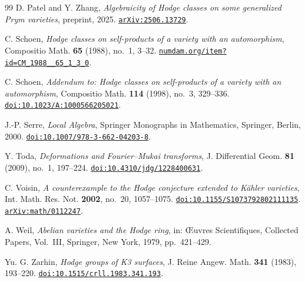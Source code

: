 \documentclass[11pt,reqno]{amsart}
\theoremstyle{plain}
\theoremstyle{definition}
\theoremstyle{remark}
\begin{document}
\begin{thebibliography}{99}
D. Patel and Y. Zhang,
\emph{Algebraicity of Hodge classes on some generalized Prym varieties},
preprint, 2025.
\href{https://arxiv.org/abs/2506.13729}{\texttt{arXiv:2506.13729}}.

C. Schoen,
\emph{Hodge classes on self-products of a variety with an automorphism},
Compositio Math. \textbf{65} (1988), no.~1, 3--32.
\href{http://www.numdam.org/item?id=CM_1988__65_1_3_0}{\texttt{numdam.org/item?id=CM\_1988\_\_65\_1\_3\_0}}.

C. Schoen,
\emph{Addendum to: Hodge classes on self-products of a variety with an
automorphism},
Compositio Math. \textbf{114} (1998), no.~3, 329--336.
\href{https://doi.org/10.1023/A:1000566205021}{\texttt{doi:10.1023/A:1000566205021}}.

J.-P. Serre,
\emph{Local Algebra},
Springer Monographs in Mathematics,
Springer, Berlin, 2000.
\href{https://doi.org/10.1007/978-3-662-04203-8}{\texttt{doi:10.1007/978-3-662-04203-8}}.

Y. Toda,
\emph{Deformations and Fourier--Mukai transforms},
J. Differential Geom. \textbf{81} (2009), no.~1, 197--224.
\href{https://doi.org/10.4310/jdg/1228400631}{\texttt{doi:10.4310/jdg/1228400631}}.

C. Voisin,
\emph{A counterexample to the Hodge conjecture extended to K\"ahler
varieties},
Int. Math. Res. Not. \textbf{2002}, no.~20, 1057--1075.
\href{https://doi.org/10.1155/S1073792802111135}{\texttt{doi:10.1155/S1073792802111135}}.
\href{https://arxiv.org/abs/math/0112247}{\texttt{arXiv:math/0112247}}.

A. Weil,
\emph{Abelian varieties and the Hodge ring},
in: \OE uvres Scientifiques, Collected Papers, Vol.~III,
Springer, New York, 1979, pp.~421--429.

Yu. G. Zarhin,
\emph{Hodge groups of K3 surfaces},
J. Reine Angew. Math. \textbf{341} (1983), 193--220.
\href{https://doi.org/10.1515/crll.1983.341.193}{\texttt{doi:10.1515/crll.1983.341.193}}.

\end{thebibliography}
\end{document}
